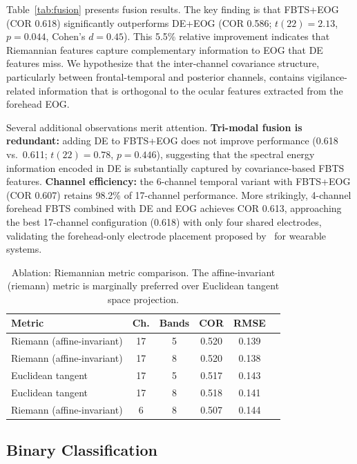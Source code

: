 \documentclass{iopjournal}
\begin{document}
Table~\ref{tab:fusion} presents fusion results. The key finding is that FBTS+EOG (COR 0.618) significantly outperforms DE+EOG (COR 0.586; $t(22)=2.13$, $p=0.044$, Cohen's $d=0.45$). This 5.5\% relative improvement indicates that Riemannian features capture complementary information to EOG that DE features miss. We hypothesize that the inter-channel covariance structure, particularly between frontal-temporal and posterior channels, contains vigilance-related information that is orthogonal to the ocular features extracted from the forehead EOG.

Several additional observations merit attention. \textbf{Tri-modal fusion is redundant:} adding DE to FBTS+EOG does not improve performance (0.618 vs.\ 0.611; $t(22)=0.78$, $p=0.446$), suggesting that the spectral energy information encoded in DE is substantially captured by covariance-based FBTS features. \textbf{Channel efficiency:} the 6-channel temporal variant with FBTS+EOG (COR 0.607) retains 98.2\% of 17-channel performance. More strikingly, 4-channel forehead FBTS combined with DE and EOG achieves COR 0.613, approaching the best 17-channel configuration (0.618) with only four shared electrodes, validating the forehead-only electrode placement proposed by~\cite{zheng2017multimodal} for wearable systems.

\begin{table}
\caption{Ablation: Riemannian metric comparison. The affine-invariant (riemann) metric is marginally preferred over Euclidean tangent space projection.}
\centering
\begin{tabular}{lccccc}
\toprule
\textbf{Metric} & \textbf{Ch.} & \textbf{Bands} & \textbf{COR} & \textbf{RMSE} \\
\midrule
Riemann (affine-invariant) & 17 & 5 & 0.520 & 0.139 \\
Riemann (affine-invariant) & 17 & 8 & 0.520 & 0.138 \\
Euclidean tangent & 17 & 5 & 0.517 & 0.143 \\
Euclidean tangent & 17 & 8 & 0.518 & 0.141 \\
Riemann (affine-invariant) & 6 & 8 & 0.507 & 0.144 \\
\bottomrule
\end{tabular}
\label{tab:metric}
\end{table}

\subsection{Binary Classification}
\end{document}
